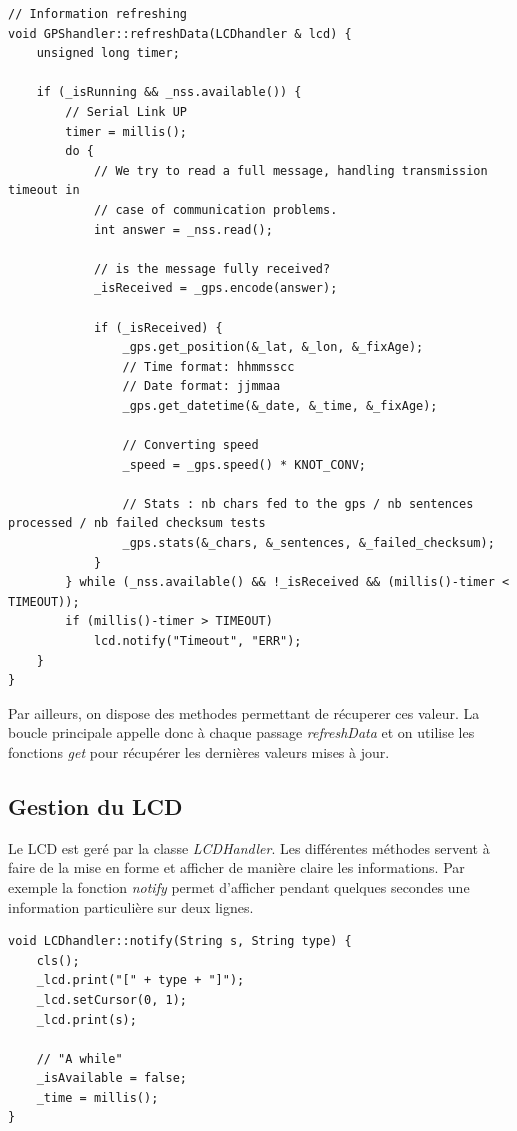 \documentclass[a4paper,12pt,titlepage]{article}
\begin{document}
\begin{lstlisting}[caption={resfreshData},label={refreshData}]
// Information refreshing
void GPShandler::refreshData(LCDhandler & lcd) {
    unsigned long timer;

    if (_isRunning && _nss.available()) {
        // Serial Link UP
        timer = millis();
        do {
            // We try to read a full message, handling transmission timeout in
            // case of communication problems.
            int answer = _nss.read();

            // is the message fully received?
            _isReceived = _gps.encode(answer);

            if (_isReceived) {
                _gps.get_position(&_lat, &_lon, &_fixAge);
                // Time format: hhmmsscc
                // Date format: jjmmaa
                _gps.get_datetime(&_date, &_time, &_fixAge);

                // Converting speed
                _speed = _gps.speed() * KNOT_CONV;

                // Stats : nb chars fed to the gps / nb sentences processed / nb failed checksum tests
                _gps.stats(&_chars, &_sentences, &_failed_checksum);
            }
        } while (_nss.available() && !_isReceived && (millis()-timer < TIMEOUT));
        if (millis()-timer > TIMEOUT)
            lcd.notify("Timeout", "ERR");
    }
}
\end{lstlisting}

Par ailleurs, on dispose des methodes permettant de récuperer ces valeur. La boucle principale appelle donc à chaque passage \emph{refreshData} et on utilise les fonctions \emph{get}
pour récupérer les dernières valeurs mises à jour.

\subsection{Gestion du LCD}

Le LCD est geré par la classe \emph{LCDHandler}. Les différentes méthodes servent à faire de la mise en forme et afficher de manière claire les informations.
Par exemple la fonction \emph{notify} permet d'afficher pendant quelques secondes une information particulière sur deux lignes.

\begin{lstlisting}[caption={notify}, label={notify}]
void LCDhandler::notify(String s, String type) {
    cls();
    _lcd.print("[" + type + "]");
    _lcd.setCursor(0, 1);
    _lcd.print(s);

    // "A while"
    _isAvailable = false;
    _time = millis();
}

\end{lstlisting}
\end{document}
